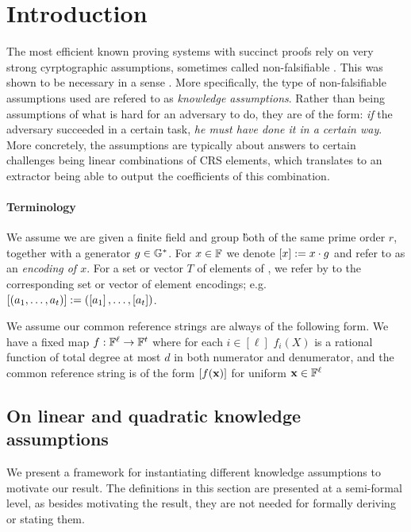 \documentclass[11pt]{article}
\numberwithin{figure}{section} %
\newcommand{\x}{\ensuremath{\mathbf{x}}\xspace}
\begin{document}
\section{Introduction}
The most efficient known proving systems with succinct proofs rely on very strong cyrptographic assumptions, sometimes called non-falsifiable \cite{Naor03}. This was shown to be necessary in a sense \cite{GW11}. More specifically, the type of non-falsifiable assumptions used are refered to as \emph{knowledge assumptions}.
Rather than being assumptions of what is hard for an adversary to do, they are of the form: \emph{if} the adversary succeeded in a certain task, \emph{he must have done it in a certain way}. More concretely, the assumptions are typically about answers to certain challenges being linear combinations of CRS elements, which translates to an extractor being able to output the coefficients of this combination.
\paragraph{Terminology}
We assume we are given a finite field \F and group \G both of the same prime order $r$,
together with a generator $g\in{\mathbb G}^*$.
For $x\in\mathbb F$ we denote $\left[x\right]:= x\cdot g$ and refer to  as an \emph{encoding of $x$}.
For a set or vector $T$ of elements of \F, we refer by  to the corresponding set or vector of element encodings;
e.g. $\left[(a_1,\ldots,a_t)\right]:= (\left[a_1\right],\ldots,\left[a_t\right])$. 

We assume our common reference strings are always of the following form.
We have a fixed map $f:\mathbb F^{\ell} \to \mathbb F^t$ where for each $i\in [\ell]$ $f_i(X)$ is a rational function of total degree at most $d$ in both numerator and denumerator,
and the common reference string is of the form $\enc{f(\x)}$ for uniform $\x\in\F^\ell$

\subsection{On linear and quadratic knowledge assumptions}
We present a framework for instantiating different knowledge assumptions to motivate our result.
The definitions in this section are presented at a semi-formal level, as besides motivating the result, they are not needed for formally deriving or stating them.
\end{document}
